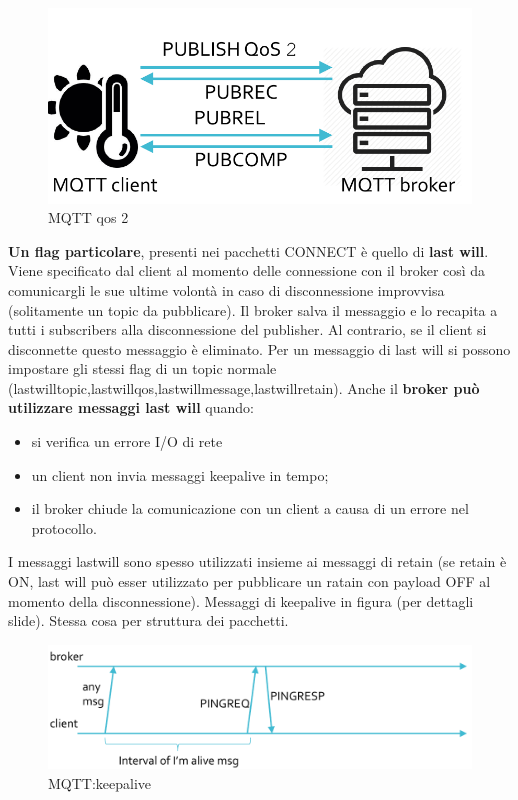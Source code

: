 \documentclass[12pt]{article}
\begin{document}
    			\begin{figure}[h!]
    				\centering
    				\includegraphics[scale=0.3]{img/qos3.png}
    				\caption{MQTT qos 2}
    			\end{figure}
    		\textbf{	Un flag particolare}, presenti nei pacchetti CONNECT è quello di \textbf{last will}. Viene specificato dal client al momento delle connessione con il broker così da comunicargli le sue ultime volontà in caso di disconnessione improvvisa (solitamente un topic da pubblicare). Il broker salva il messaggio e lo recapita a tutti i subscribers alla disconnessione del publisher. Al contrario, se il client si disconnette questo messaggio è eliminato. Per un messaggio di last will si possono impostare gli stessi flag di un topic normale (lastwilltopic,lastwillqos,lastwillmessage,lastwillretain). Anche il \textbf{broker può utilizzare messaggi last will} quando:
    		\begin{itemize}
    			\item si verifica un errore I/O di rete
    			\item un client non invia messaggi keepalive in tempo;
    			\item il broker chiude la comunicazione con un client a causa di un errore nel protocollo.
    		\end{itemize}
    		I messaggi lastwill sono spesso utilizzati insieme ai messaggi di retain (se retain è ON, last will può esser utilizzato per pubblicare un ratain con payload OFF al momento della disconnessione). Messaggi di keepalive in figura (per dettagli slide). Stessa cosa per struttura dei pacchetti.
    		\begin{figure}[h!]
    			\centering
    			\includegraphics[scale=0.3]{img/keepalive.png}
    			\caption{MQTT:keepalive}
    		\end{figure}
\end{document}
